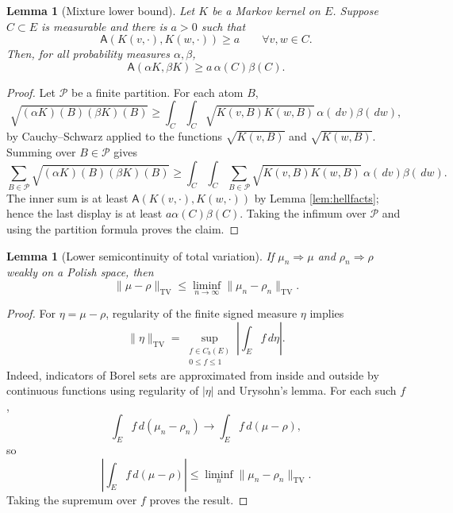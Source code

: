 \documentclass[12pt]{article}
\newcommand{\1}{\mathbf 1}
\newcommand{\dd}{\,d}
\newcommand{\TV}{\mathrm{TV}}
\newcommand{\Aff}{\mathsf A}
\theoremstyle{plain}
\newtheorem{lemma}[theorem]{Lemma}
\theoremstyle{definition}
\theoremstyle{remark}
\numberwithin{equation}{section}
\begin{document}
\begin{lemma}[Mixture lower bound]\label{lem:mixture}
Let \(K\) be a Markov kernel on \(E\).  Suppose \(C\subset E\) is measurable and
there is \(a>0\) such that
\[
\Aff(K(v,\cdot),K(w,\cdot))\ge a\qquad\forall v,w\in C.
\]
Then, for all probability measures \(\alpha,\beta\),
\[
\Aff(\alpha K,\beta K)\ge a\,\alpha(C)\beta(C).
\]
\end{lemma}

\begin{proof}
Let \(\mathcal P\) be a finite partition.  For each atom \(B\),
\[
\sqrt{(\alpha K)(B)(\beta K)(B)}
\ge
\int_C\int_C\sqrt{K(v,B)K(w,B)}\,\alpha(\dd v)\beta(\dd w),
\]
by Cauchy--Schwarz applied to the functions \(\sqrt{K(v,B)}\) and
\(\sqrt{K(w,B)}\).  Summing over \(B\in\mathcal P\) gives
\[
\sum_{B\in\mathcal P}\sqrt{(\alpha K)(B)(\beta K)(B)}
\ge
\int_C\int_C
\sum_{B\in\mathcal P}\sqrt{K(v,B)K(w,B)}
\,\alpha(\dd v)\beta(\dd w).
\]
The inner sum is at least
\(\Aff(K(v,\cdot),K(w,\cdot))\) by Lemma \ref{lem:hellfacts}; hence the last
display is at least \(a\alpha(C)\beta(C)\).  Taking the infimum over
\(\mathcal P\) and using the partition formula proves the claim.
\end{proof}

\begin{lemma}[Lower semicontinuity of total variation]\label{lem:tv-lsc}
If \(\mu_n\Rightarrow\mu\) and \(\rho_n\Rightarrow\rho\) weakly on a Polish
space, then
\[
\|\mu-\rho\|_{\TV}
\le
\liminf_{n\to\infty}\|\mu_n-\rho_n\|_{\TV}.
\]
\end{lemma}

\begin{proof}
For \(\eta=\mu-\rho\), regularity of the finite signed measure \(\eta\) implies
\[
\|\eta\|_{\TV}
=
\sup_{\substack{f\in C_b(E)\\0\le f\le1}}
\left|\int_Ef\dd\eta\right|.
\]
Indeed, indicators of Borel sets are approximated from inside and outside by
continuous functions using regularity of \(|\eta|\) and Urysohn's lemma.  For
each such \(f\),
\[
\int_Ef\dd(\mu_n-\rho_n)\longrightarrow\int_Ef\dd(\mu-\rho),
\]
so
\[
\left|\int_Ef\dd(\mu-\rho)\right|
\le
\liminf_n\|\mu_n-\rho_n\|_{\TV}.
\]
Taking the supremum over \(f\) proves the result.
\end{proof}
\end{document}
